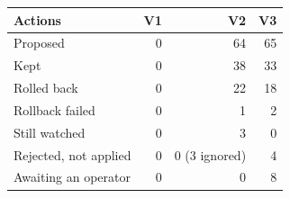 \begin{tabular}{|l|r|r|r|}
\hline
Actions & V1 & V2 & V3 \\
\hline
Proposed & 0 & 64 & 65 \\
\hline
Kept & 0 & 38 & 33 \\
\hline
Rolled back & 0 & 22 & 18 \\
\hline
Rollback failed & 0 & 1 & 2 \\
\hline
Still watched & 0 & 3 & 0 \\
\hline
Rejected, not applied & 0 & 0 (3 ignored) & 4 \\
\hline
Awaiting an operator & 0 & 0 & 8 \\
\hline
\end{tabular}
